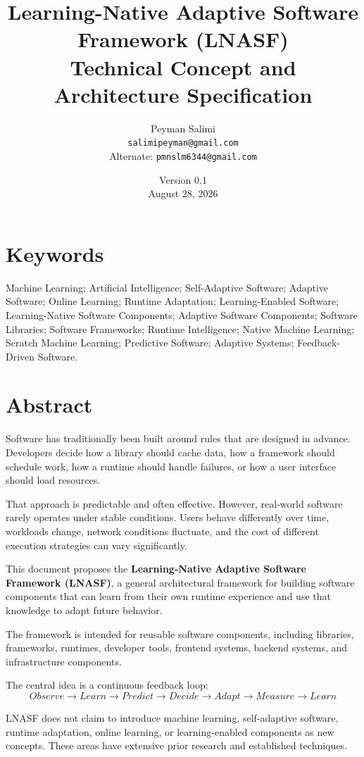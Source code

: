 \documentclass[11pt,a4paper]{article}
\title{Learning-Native Adaptive Software Framework (LNASF)\\\large Technical Concept and Architecture Specification}
\author{Peyman Salimi\\\texttt{salimipeyman@gmail.com}\\\small Alternate: \texttt{pmnslm6344@gmail.com}}
\date{Version 0.1\\August 28, 2026}
\begin{document}
\maketitle
\tableofcontents
\newpage

\section*{Keywords}
Machine Learning; Artificial Intelligence; Self-Adaptive Software; Adaptive Software; Online Learning; Runtime Adaptation; Learning-Enabled Software; Learning-Native Software Components; Adaptive Software Components; Software Libraries; Software Frameworks; Runtime Intelligence; Native Machine Learning; Scratch Machine Learning; Predictive Software; Adaptive Systems; Feedback-Driven Software.

\section*{Abstract}
Software has traditionally been built around rules that are designed in advance. Developers decide how a library should cache data, how a framework should schedule work, how a runtime should handle failures, or how a user interface should load resources.

That approach is predictable and often effective. However, real-world software rarely operates under stable conditions. Users behave differently over time, workloads change, network conditions fluctuate, and the cost of different execution strategies can vary significantly.

This document proposes the \textbf{Learning-Native Adaptive Software Framework (LNASF)}, a general architectural framework for building software components that can learn from their own runtime experience and use that knowledge to adapt future behavior.

The framework is intended for reusable software components, including libraries, frameworks, runtimes, developer tools, frontend systems, backend systems, and infrastructure components.

The central idea is a continuous feedback loop:
\[
Observe \rightarrow Learn \rightarrow Predict \rightarrow Decide \rightarrow Adapt \rightarrow Measure \rightarrow Learn
\]

LNASF does not claim to introduce machine learning, self-adaptive software, runtime adaptation, online learning, or learning-enabled components as new concepts. These areas have extensive prior research and established techniques.
\end{document}
